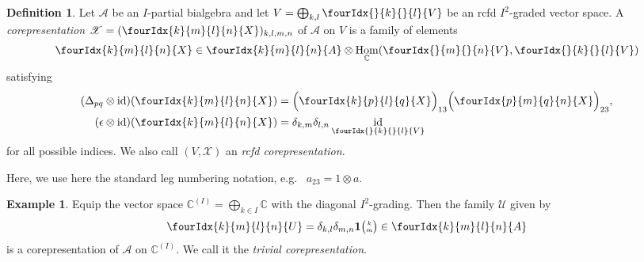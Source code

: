 \documentclass[10pt]{article}
\DeclareMathOperator{\id}{id}
\DeclareMathOperator{\Hom}{Hom}
\newcommand{\C}{\mathbb{C}}
\newcommand{\Grt}[3]{#1{\tiny{\begin{pmatrix} #2\\#3\end{pmatrix}}}}
\newcommand{\UnitC}[2]{\Grt{\mathbf{1}}{#1}{#2}}
\newcommand{\Gr}[5]{\fourIdx{#2}{#4}{#3}{#5}{#1}}%
\newcommand{\Gru}[3]{\Gr{#1}{}{}{#2}{#3}}
\theoremstyle{definition}
\newtheorem{Def}[Theorem]{Definition}
\newtheorem{Exa}[Theorem]{Example}
\numberwithin{equation}{section}
\begin{document}
\begin{Def} \label{definition:corep} Let $\mathscr{A}$ be an
  $I$-partial bialgebra and let $V=\bigoplus_{k,l} \Gru{V}{k}{l}$
   be
an rcfd $I^{2}$-graded vector space.  A \emph{corepresentation}
  $\mathscr{X}=(\Gr{X}{k}{l}{m}{n})_{k,l,m,n}$ of $\mathscr{A}$ on $V$
  is a family of elements
 \begin{align} \label{eq:rep-blocks}
   \Gr{X}{k}{l}{m}{n} \in \Gr{A}{k}{l}{m}{n} \otimes
  \Hom_\C(\Gru{V}{m}{n},\Gru{V}{k}{l})
 \end{align}
 satisfying 
 \begin{align}
   \label{eq:rep-comultiplication}
    (\Delta_{pq} \otimes
    \id)(\Gr{X}{k}{l}{m}{n}) &=
    \Big{(}\Gr{X}{k}{l}{p}{q}\Big{)}_{13}\Big{(}\Gr{X}{p}{q}{m}{n}\Big{)}_{23},
    \\ \label{eq:rep-counit}
(\epsilon \otimes
  \id)(\Gr{X}{k}{l}{m}{n})&=\delta_{k,m}\delta_{l,n}\id_{\Gru{V}{k}{l}}
 \end{align}
  for all possible indices. We also call $(V,\mathscr{X})$ an
  \emph{rcfd corepresentation}.
\end{Def}
Here, we use here the standard leg numbering notation, e.g.~ $a_{23}=1\otimes a$.
\begin{Exa} \label{example:rep-triv} Equip the vector space
  $\C^{(I)}=\bigoplus_{k\in I} \C$ with the diagonal
  $I^{2}$-grading. Then the family $\mathscr{U}$ given by
  \begin{align} \label{eq:rep-triv}
    \Gr{U}{k}{l}{m}{n} = \delta_{k,l}\delta_{m,n} \UnitC{k}{m} \in
    \Gr{A}{k}{l}{m}{n}
  \end{align}
is a corepresentation of $\mathscr{A}$ on $\C^{(I)}$. We call it the
\emph{trivial corepresentation}.
\end{Exa}
\end{document}
